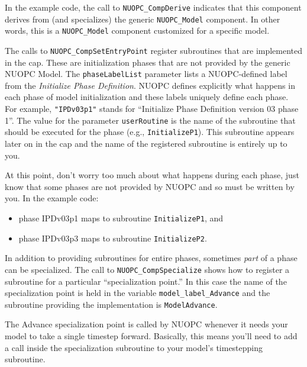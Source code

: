    In the example code, the call to {\tt NUOPC\_CompDerive} indicates that
   this component derives from (and specializes) the generic {\tt NUOPC\_Model}
   component.  In other words, this is a {\tt NUOPC\_Model} component customized
   for a specific model.
  
   The calls to {\tt NUOPC\_CompSetEntryPoint} register
   subroutines that are implemented in the cap.  These are initialization phases
   that are not provided by the generic NUOPC Model.
   The {\tt phaseLabelList} parameter lists a NUOPC-defined label from the \emph{Initialize Phase
   Definition}.  NUOPC defines explicitly what happens in each phase of model
   initialization and these labels uniquely define each phase.  For example, 
   {\tt "IPDv03p1"} stands for ``Initialize Phase Definition version 03 phase 1''. The
   value for the parameter {\tt userRoutine} is the name of the subroutine that should
   be executed for the phase (e.g., {\tt InitializeP1}).   This subroutine
   appears later on in the cap and the name of the registered subroutine is entirely
   up to you.
 
   At this point, don't worry too much about what happens during each phase, just
   know that some phases are not provided by NUOPC and so must be written
   by you.  In the example code:
   \begin{itemize}
   \item phase IPDv03p1 maps to subroutine {\tt InitializeP1}, and
   \item phase IPDv03p3 maps to subroutine {\tt InitializeP2}.
   \end{itemize}
  
   In addition to providing subroutines for entire phases, sometimes \emph{part} of
   a phase can be specialized.  The call to {\tt NUOPC\_CompSpecialize} shows how
   to register a subroutine for a particular ``specialization point.'' In this
   case the name of the specialization point is held in the variable
   {\tt model\_label\_Advance} and the subroutine providing the implementation is
   {\tt ModelAdvance}.
  
   The Advance specialization point is called by NUOPC whenever it needs
   your model to take a single timestep forward.  Basically, this means
   you'll need to add a call inside the specialization subroutine to your
   model's timestepping subroutine. 

